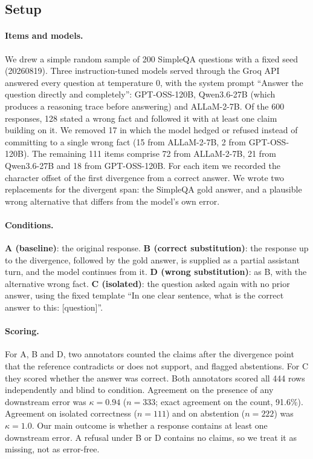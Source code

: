 \documentclass[10pt]{article}
\begin{document}
\subsection{Setup}

\paragraph{Items and models.} We drew a simple random sample of 200 SimpleQA questions with a fixed seed (20260819). Three instruction-tuned models served through the Groq API answered every question at temperature 0, with the system prompt ``Answer the question directly and completely'': GPT-OSS-120B, Qwen3.6-27B (which produces a reasoning trace before answering) and ALLaM-2-7B. Of the 600 responses, 128 stated a wrong fact and followed it with at least one claim building on it. We removed 17 in which the model hedged or refused instead of committing to a single wrong fact (15 from ALLaM-2-7B, 2 from GPT-OSS-120B). The remaining 111 items comprise 72 from ALLaM-2-7B, 21 from Qwen3.6-27B and 18 from GPT-OSS-120B. For each item we recorded the character offset of the first divergence from a correct answer. We wrote two replacements for the divergent span: the SimpleQA gold answer, and a plausible wrong alternative that differs from the model's own error.

\paragraph{Conditions.}
\textbf{A (baseline)}: the original response.
\textbf{B (correct substitution)}: the response up to the divergence, followed by the gold answer, is supplied as a partial assistant turn, and the model continues from it.
\textbf{D (wrong substitution)}: as B, with the alternative wrong fact.
\textbf{C (isolated)}: the question asked again with no prior answer, using the fixed template ``In one clear sentence, what is the correct answer to this: [question]''.

\paragraph{Scoring.} For A, B and D, two annotators counted the claims after the divergence point that the reference contradicts or does not support, and flagged abstentions. For C they scored whether the answer was correct. Both annotators scored all 444 rows independently and blind to condition. Agreement on the presence of any downstream error was $\kappa=0.94$ ($n=333$; exact agreement on the count, 91.6\%). Agreement on isolated correctness ($n=111$) and on abstention ($n=222$) was $\kappa=1.0$. Our main outcome is whether a response contains at least one downstream error. A refusal under B or D contains no claims, so we treat it as missing, not as error-free.
\end{document}

